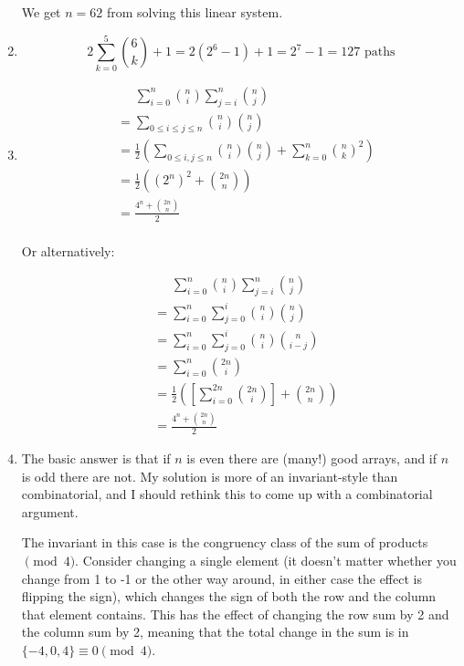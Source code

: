 \documentclass{book}
\numberwithin{equation}{section}
\begin{document}
\begin{enumerate}[label={9.\arabic*}]
We get $n=62$ from solving this linear system.

\item
$$2\sum_{k=0}^{5} {6 \choose k} + 1 = 2(2^6 - 1) + 1 = 2^7 - 1 = 127 \text{ paths}$$

\item
\begin{align*}
& \;\;\;\;\; \sum_{i=0}^n {n \choose i} \sum_{j=i}^n {n \choose j} \\
& = \sum_{0 \leq i \leq j \leq n} {n \choose i}{n \choose j} \\
& = \frac{1}{2}\left(\sum_{0 \leq i, j \leq n} {n \choose i}{n \choose j} + \sum_{k=0}^n {n \choose k}^2 \right) \\
& = \frac{1}{2}\left((2^n)^2 + {2n \choose n}\right) \\
& = \frac{4^n + {2n \choose n}}{2} \\
\end{align*}

Or alternatively:

\begin{align*}
& \;\;\;\;\; \sum_{i=0}^n {n \choose i} \sum_{j=i}^n {n \choose j} \\
& = \sum_{i=0}^n \sum_{j=0}^i {n \choose i} {n \choose j} \\
& = \sum_{i=0}^n \sum_{j=0}^i {n \choose i} {n \choose i-j} \\
& = \sum_{i=0}^n {2n \choose i} \\
& = \frac{1}{2}\left( \left[\sum_{i=0}^{2n} {2n \choose i}\right] + {2n \choose n} \right) \\
& = \frac{4^n + {2n \choose n}}{2}
\end{align*}

\item
The basic answer is that if $n$ is even there are (many!) good arrays, and if $n$ is odd there are not. My solution
is more of an invariant-style than combinatorial, and I should rethink this to come up with a combinatorial argument.

The invariant in this case is the congruency class of the sum of products $\pmod{4}$. Consider changing a single
element (it doesn't matter whether you change from 1 to -1 or the other way around, in either case the effect
is flipping the sign), which changes the sign of both the row and the column that element contains. This has the
effect of changing the row sum by 2 and the column sum by 2, meaning that the total change in the sum is in
$\{-4, 0, 4\} \equiv 0 \pmod{4}$.


\end{enumerate}
\end{document}
